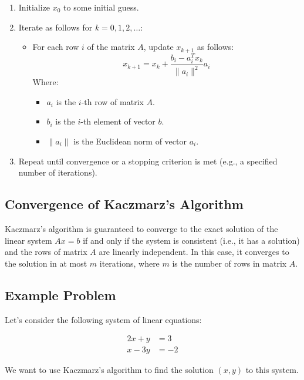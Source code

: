 \documentclass[a4paper]{article}
\begin{document}
\begin{enumerate}
    \item Initialize \(x_0\) to some initial guess.
    
    \item Iterate as follows for \(k = 0, 1, 2, \ldots\):
    \begin{itemize}
        \item For each row \(i\) of the matrix \(A\), update \(x_{k+1}\) as follows:
        \[
        x_{k+1} = x_k + \frac{b_i - a_i^Tx_k}{\|a_i\|^2}a_i
        \]
        Where:
        \begin{itemize}
            \item \(a_i\) is the \(i\)-th row of matrix \(A\).
            \item \(b_i\) is the \(i\)-th element of vector \(b\).
            \item \(\|a_i\|\) is the Euclidean norm of vector \(a_i\).
        \end{itemize}
    \end{itemize}
    
    \item Repeat until convergence or a stopping criterion is met (e.g., a specified number of iterations).
\end{enumerate}

\subsection{Convergence of Kaczmarz's Algorithm}

Kaczmarz's algorithm is guaranteed to converge to the exact solution of the linear system \(Ax = b\) if and only if the system is consistent (i.e., it has a solution) and the rows of matrix \(A\) are linearly independent. In this case, it converges to the solution in at most \(m\) iterations, where \(m\) is the number of rows in matrix \(A\).

\subsection{Example Problem}

Let's consider the following system of linear equations:


\begin{align*}
2x + y &= 3 \\
x - 3y &= -2
\end{align*}


We want to use Kaczmarz's algorithm to find the solution \((x, y)\) to this system.
\end{document}
